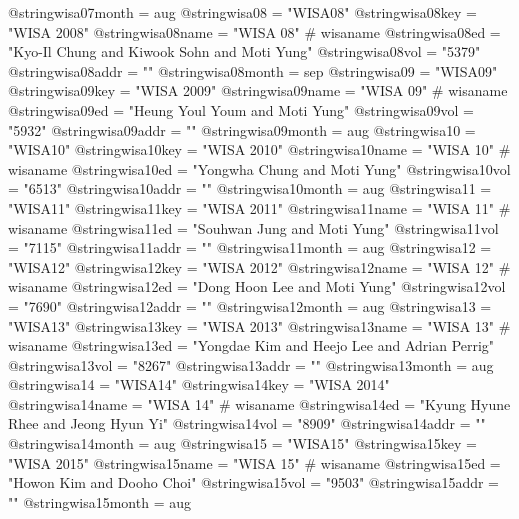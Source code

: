 @string{wisa07month =           aug}
@string{wisa08 =                "WISA08"}
@string{wisa08key =             "WISA 2008"}
@string{wisa08name =            "WISA 08" # wisaname}
@string{wisa08ed =              "Kyo-Il Chung and Kiwook Sohn and Moti Yung"}
@string{wisa08vol =             "5379"}
@string{wisa08addr =            ""}
@string{wisa08month =           sep}
@string{wisa09 =                "WISA09"}
@string{wisa09key =             "WISA 2009"}
@string{wisa09name =            "WISA 09" # wisaname}
@string{wisa09ed =              "Heung Youl Youm and Moti Yung"}
@string{wisa09vol =             "5932"}
@string{wisa09addr =            ""}
@string{wisa09month =           aug}
@string{wisa10 =                "WISA10"}
@string{wisa10key =             "WISA 2010"}
@string{wisa10name =            "WISA 10" # wisaname}
@string{wisa10ed =              "Yongwha Chung and Moti Yung"}
@string{wisa10vol =             "6513"}
@string{wisa10addr =            ""}
@string{wisa10month =           aug}
@string{wisa11 =                "WISA11"}
@string{wisa11key =             "WISA 2011"}
@string{wisa11name =            "WISA 11" # wisaname}
@string{wisa11ed =              "Souhwan Jung and Moti Yung"}
@string{wisa11vol =             "7115"}
@string{wisa11addr =            ""}
@string{wisa11month =           aug}
@string{wisa12 =                "WISA12"}
@string{wisa12key =             "WISA 2012"}
@string{wisa12name =            "WISA 12" # wisaname}
@string{wisa12ed =              "Dong Hoon Lee and Moti Yung"}
@string{wisa12vol =             "7690"}
@string{wisa12addr =            ""}
@string{wisa12month =           aug}
@string{wisa13 =                "WISA13"}
@string{wisa13key =             "WISA 2013"}
@string{wisa13name =            "WISA 13" # wisaname}
@string{wisa13ed =              "Yongdae Kim and Heejo Lee and Adrian Perrig"}
@string{wisa13vol =             "8267"}
@string{wisa13addr =            ""}
@string{wisa13month =           aug}
@string{wisa14 =                "WISA14"}
@string{wisa14key =             "WISA 2014"}
@string{wisa14name =            "WISA 14" # wisaname}
@string{wisa14ed =              "Kyung Hyune Rhee and Jeong Hyun Yi"}
@string{wisa14vol =             "8909"}
@string{wisa14addr =            ""}
@string{wisa14month =           aug}
@string{wisa15 =                "WISA15"}
@string{wisa15key =             "WISA 2015"}
@string{wisa15name =            "WISA 15" # wisaname}
@string{wisa15ed =              "Howon Kim and Dooho Choi"}
@string{wisa15vol =             "9503"}
@string{wisa15addr =            ""}
@string{wisa15month =           aug}
